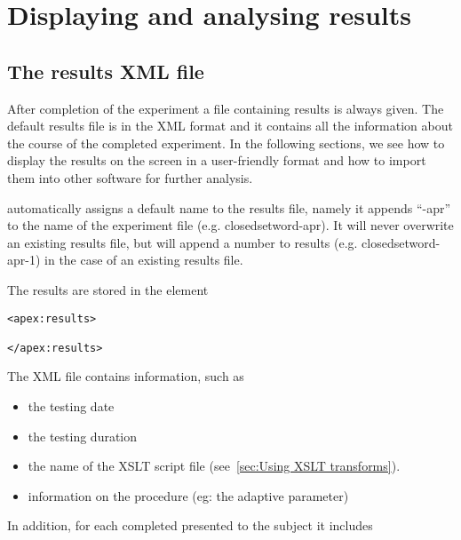 \chapter{Displaying and analysing results}
\label{chap:Results}
\section{The results XML file}

After completion of the experiment a file containing results is
always given. The default results file is in the XML format and it
contains all the information about the course of the completed
experiment. In the following sections, we see how to display the
results on the screen in a user-friendly format and how to import
them into other software for further analysis.

\apex automatically assigns a default name to the results file,
namely it appends ``-apr'' to the name of the experiment file
(e.g. closedsetword-apr). It will never overwrite an existing
results file, but will append a number to results (e.g.
closedsetword-apr-1) in the case of an existing results file.

The results are stored in the element
\begin{lstlisting}
<apex:results>

</apex:results>
\end{lstlisting}

The XML file contains  information, such as

\begin{itemize}
\item the testing date

\item the testing duration

\item the name of the XSLT script file (see~\ref{sec:Using XSLT
transforms}). 

\item information on the procedure (eg: the adaptive parameter)

\end{itemize}

In addition, for each completed  presented to the
subject it includes

